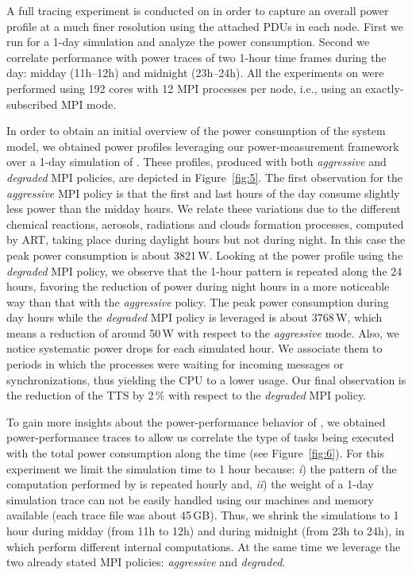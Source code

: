 A full tracing  experiment is conducted on \tinto  in order to capture
an overall power profile at a much finer resolution using the attached
PDUs in each  node. First we run \cosmoart for  a 1-day simulation and
analyze the  power consumption.  Second we  correlate performance with
power  traces  of  two  1-hour  time frames  during  the  day:  midday
(11h--12h) and midnight (23h--24h). All the experiments on \tinto were performed
using 192 cores with 12 MPI processes per node, i.e., using an exactly-subscribed MPI mode.

In order to obtain an initial overview of the power consumption of the
system  model,  we  obtained  power  profiles  leveraging  our  \pmlib
power-measurement    framework   over    a    1-day   simulation    of
\cosmoart. These profiles, produced with both \emph{aggressive} and \emph{degraded} MPI
policies,  are depicted in  Figure~\ref{fig:5}. The  first observation
for the \emph{aggressive} MPI policy is that the first and last hours of the day
consume slightly less  power than the midday hours.  We relate these
variations  due   to  the  different   chemical  reactions,  aerosols,
radiations  and clouds  formation processes,  computed by  ART, taking
place during  daylight hours  but not during  night. In this  case the
peak power consumption is about  3821\,W. Looking at the power profile
using the \emph{degraded}  MPI policy, we observe that  the 1-hour pattern is
repeated along  the 24 hours, favoring  the reduction of  power during
night  hours in  a  more noticeable  way  than that  with the   \emph{aggressive}
policy.   The peak  power consumption  during day  hours  while the
 \emph{degraded}  MPI policy  is leveraged  is  about 3768\,W,  which means  a
reduction of around  50\,W with respect to the  \emph{aggressive} mode. Also, we
notice systematic  power drops for each simulated  hour.  We associate
them  to periods  in  which  the processes  were waiting  for
incoming messages  or synchronizations, thus  yielding the CPU  to a lower
usage. Our final observation is the reduction of the TTS by 2\,\% with
respect to the  \emph{degraded} MPI policy.

To  gain  more  insights   about  the  power-performance  behavior  of
\cosmoart,  we  obtained power-per\-for\-man\-ce  traces  to allow  us
correlate  the type  of  tasks  being executed  with  the total  power
consumption  along  the   time  (see  Figure~\ref{fig:6}).   For  this
experiment we  limit the simulation  time to 1 hour  because: \emph{i})
the  pattern of  the computation  performed by  \cosmoart  is repeated
hourly and, \emph{ii}) the weight  of a 1-day simulation trace can not
be easily handled using our  machines and memory available (each trace
file was about 45\,GB). Thus, we shrink the simulations
to 1 hour during midday (from 11h  to 12h) and during
midnight  (from 23h  to  24h), in  which  \cosmoart perform  different
internal computations.  At  the same time we leverage  the two already
stated MPI policies: \emph{aggressive} and \emph{degraded}.

